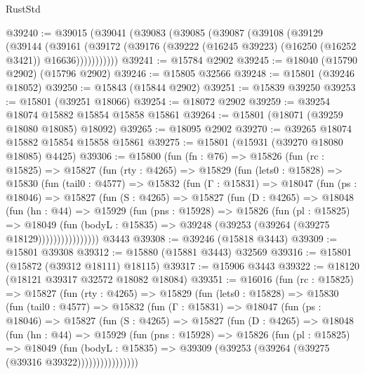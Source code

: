 \begin{lexlean}{RustStd}
\begin{coremodule}
@39240 := @39015
    (@39041
      (@39083
        (@39085
          (@39087
            (@39108
              (@39129
                (@39144
                  (@39161
                    (@39172
                      (@39176 (@39222 (@16245 @39223) (@16250 (@16252 @3421)) @16636)))))))))))
@39241 := @15784 @2902
@39245 := @18040 (@15790 @2902) (@15796 @2902)
@39246 := @15805 @32566
@39248 := @15801 (@39246 @18052)
@39250 := @15843 (@15844 @2902)
@39251 := @15839 @39250
@39253 := @15801 (@39251 @18066)
@39254 := @18072 @2902
@39259 := @39254 @18074 @15882 @15854 @15858 @15861
@39264 := @15801 (@18071 (@39259 @18080 @18085) @18092)
@39265 := @18095 @2902
@39270 := @39265 @18074 @15882 @15854 @15858 @15861
@39275 := @15801 (@15931 (@39270 @18080 @18085) @4425)
@39306 := @15800
    (fun (fn : @76) =>
    @15826
      (fun (rc : @15825) =>
      @15827
        (fun (rty : @4265) =>
        @15829
          (fun (lets0 : @15828) =>
          @15830
            (fun (tail0 : @4577) =>
            @15832
              (fun (Γ : @15831) =>
              @18047
                (fun (ps : @18046) =>
                @15827
                  (fun (S : @4265) =>
                  @15827
                    (fun (D : @4265) =>
                    @18048
                      (fun (hn : @44) =>
                      @15929
                        (fun (pns : @15928) =>
                        @15826
                          (fun (pl : @15825) =>
                          @18049
                            (fun (bodyL : @15835) =>
                            @39248 (@39253 (@39264 (@39275 @18129))))))))))))))))
    @3443
@39308 := @39246 (@15818 @3443)
@39309 := @15801 @39308
@39312 := @15880 (@15881 @3443) @32569
@39316 := @15801 (@15872 (@39312 @18111) @18115)
@39317 := @15906 @3443
@39322 := @18120 (@18121 @39317 @32572 @18082 @18084)
@39351 := @16016
    (fun (rc : @15825) =>
    @15827
      (fun (rty : @4265) =>
      @15829
        (fun (lets0 : @15828) =>
        @15830
          (fun (tail0 : @4577) =>
          @15832
            (fun (Γ : @15831) =>
            @18047
              (fun (ps : @18046) =>
              @15827
                (fun (S : @4265) =>
                @15827
                  (fun (D : @4265) =>
                  @18048
                    (fun (hn : @44) =>
                    @15929
                      (fun (pns : @15928) =>
                      @15826
                        (fun (pl : @15825) =>
                        @18049
                          (fun (bodyL : @15835) =>
                          @39309 (@39253 (@39264 (@39275 (@39316 @39322))))))))))))))))

\end{coremodule}
\end{lexlean}
